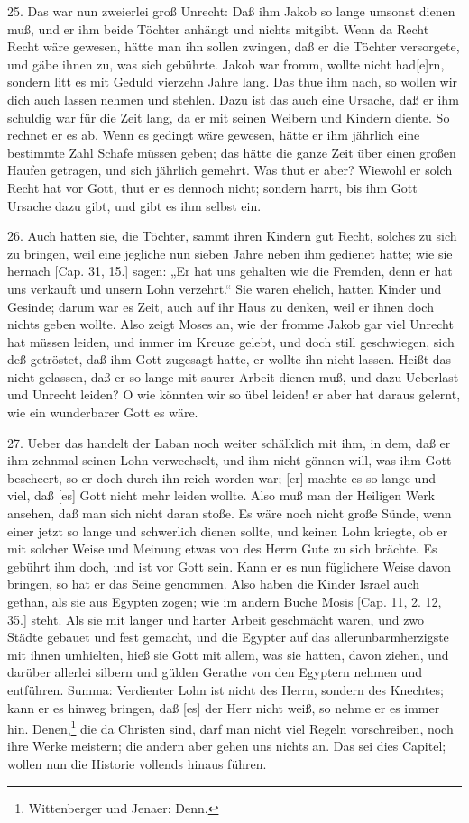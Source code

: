 25. Das war nun zweierlei groß Unrecht: Daß ihm Jakob so lange umsonst dienen muß, und er ihm beide Töchter anhängt und nichts mitgibt. Wenn da Recht Recht wäre gewesen, hätte man ihn sollen zwingen, daß er die Töchter versorgete, und gäbe ihnen zu, was sich gebührte. Jakob war fromm, wollte nicht had[e]rn, sondern litt es mit Geduld vierzehn Jahre lang. Das thue ihm nach, so wollen wir dich auch lassen nehmen und stehlen. Dazu ist das auch eine Ursache, daß er ihm schuldig war für die Zeit lang, da er mit seinen Weibern und Kindern diente. So rechnet er es ab. Wenn es gedingt wäre gewesen, hätte er ihm jährlich eine bestimmte Zahl Schafe müssen geben; das hätte die ganze Zeit über einen großen Haufen getragen, und sich jährlich gemehrt. Was thut er aber? Wiewohl er solch Recht hat vor Gott, thut er es dennoch nicht; sondern harrt, bis ihm Gott Ursache dazu gibt, und gibt es ihm selbst ein.

26. Auch hatten sie, die Töchter, sammt ihren Kindern gut Recht, solches zu sich zu bringen, weil eine jegliche nun sieben Jahre neben ihm gedienet hatte; wie sie hernach [Cap. 31, 15.] sagen: „Er hat uns gehalten wie die Fremden, denn er hat uns verkauft und unsern Lohn verzehrt.“ Sie waren ehelich, hatten Kinder und Gesinde; darum war es Zeit, auch auf ihr Haus zu denken, weil er ihnen doch nichts geben wollte. Also zeigt Moses an, wie der fromme Jakob gar viel Unrecht hat müssen leiden, und immer im Kreuze gelebt, und doch still geschwiegen, sich deß getröstet, daß ihm Gott zugesagt hatte, er wollte ihn nicht lassen. Heißt das nicht gelassen, daß er so lange mit saurer Arbeit dienen muß, und dazu Ueberlast und Unrecht leiden? O wie könnten wir so übel leiden! er aber hat daraus gelernt, wie ein wunderbarer Gott es wäre.

27. Ueber das handelt der Laban noch weiter schälklich mit ihm, in dem, daß er ihm zehnmal seinen Lohn verwechselt, und ihm nicht gönnen will, was ihm Gott bescheert, so er doch durch ihn reich worden war; [er] machte es so lange und viel, daß [es] Gott nicht mehr leiden wollte. Also muß man der Heiligen Werk ansehen, daß man sich nicht daran stoße. Es wäre noch nicht große Sünde, wenn einer jetzt so lange und schwerlich dienen sollte, und keinen Lohn kriegte, ob er mit solcher Weise und Meinung etwas von des Herrn Gute zu sich brächte. Es gebührt ihm doch, und ist vor Gott sein. Kann er es nun füglichere Weise davon bringen, so hat er das Seine genommen. Also haben die Kinder Israel auch gethan, als sie aus Egypten zogen; wie im andern Buche Mosis [Cap. 11, 2. 12, 35.] steht. Als sie mit langer und harter Arbeit geschmächt waren, und zwo Städte gebauet und fest gemacht, und die Egypter auf das allerunbarmherzigste mit ihnen umhielten, hieß sie Gott mit allem, was sie hatten, davon ziehen, und darüber allerlei silbern und gülden Gerathe von den Egyptern nehmen und entführen. Summa: Verdienter Lohn ist nicht des Herrn, sondern des Knechtes; kann er es hinweg bringen, daß [es] der Herr nicht weiß, so nehme er es immer hin. Denen,\footnote{Wittenberger und Jenaer: Denn.} die da Christen sind, darf man nicht viel Regeln vorschreiben, noch ihre Werke meistern; die andern aber gehen uns nichts an. Das sei dies Capitel; wollen nun die Historie vollends hinaus führen.

